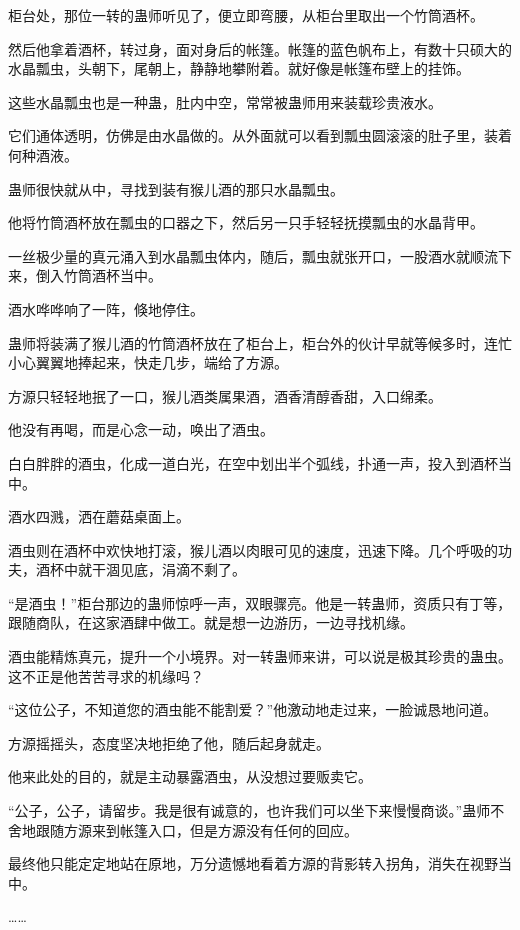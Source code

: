 \begin{this_body}
柜台处，那位一转的蛊师听见了，便立即弯腰，从柜台里取出一个竹筒酒杯。

然后他拿着酒杯，转过身，面对身后的帐篷。帐篷的蓝色帆布上，有数十只硕大的水晶瓢虫，头朝下，尾朝上，静静地攀附着。就好像是帐篷布壁上的挂饰。

这些水晶瓢虫也是一种蛊，肚内中空，常常被蛊师用来装载珍贵液水。

它们通体透明，仿佛是由水晶做的。从外面就可以看到瓢虫圆滚滚的肚子里，装着何种酒液。

蛊师很快就从中，寻找到装有猴儿酒的那只水晶瓢虫。

他将竹筒酒杯放在瓢虫的口器之下，然后另一只手轻轻抚摸瓢虫的水晶背甲。

一丝极少量的真元涌入到水晶瓢虫体内，随后，瓢虫就张开口，一股酒水就顺流下来，倒入竹筒酒杯当中。

酒水哗哗响了一阵，倏地停住。

蛊师将装满了猴儿酒的竹筒酒杯放在了柜台上，柜台外的伙计早就等候多时，连忙小心翼翼地捧起来，快走几步，端给了方源。

方源只轻轻地抿了一口，猴儿酒类属果酒，酒香清醇香甜，入口绵柔。

他没有再喝，而是心念一动，唤出了酒虫。

白白胖胖的酒虫，化成一道白光，在空中划出半个弧线，扑通一声，投入到酒杯当中。

酒水四溅，洒在蘑菇桌面上。

酒虫则在酒杯中欢快地打滚，猴儿酒以肉眼可见的速度，迅速下降。几个呼吸的功夫，酒杯中就干涸见底，涓滴不剩了。

“是酒虫！”柜台那边的蛊师惊呼一声，双眼骤亮。他是一转蛊师，资质只有丁等，跟随商队，在这家酒肆中做工。就是想一边游历，一边寻找机缘。

酒虫能精炼真元，提升一个小境界。对一转蛊师来讲，可以说是极其珍贵的蛊虫。这不正是他苦苦寻求的机缘吗？

“这位公子，不知道您的酒虫能不能割爱？”他激动地走过来，一脸诚恳地问道。

方源摇摇头，态度坚决地拒绝了他，随后起身就走。

他来此处的目的，就是主动暴露酒虫，从没想过要贩卖它。

“公子，公子，请留步。我是很有诚意的，也许我们可以坐下来慢慢商谈。”蛊师不舍地跟随方源来到帐篷入口，但是方源没有任何的回应。

最终他只能定定地站在原地，万分遗憾地看着方源的背影转入拐角，消失在视野当中。

……


\end{this_body}
